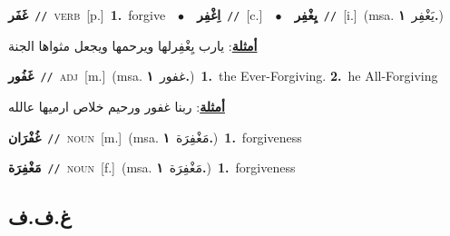 \documentclass[10pt,a4paper,twoside]{article} %
\begin{document}
\begin{multicols}{2}
{\setlength\topsep{0pt}\textbf{\foreignlanguage{arabic}{غَفَر}}\ {\color{gray}\texttt{//}\color{black}}\ \textsc{verb}\ [p.]\ \textbf{1.}~forgive\ \ $\bullet$\ \ \setlength\topsep{0pt}\textbf{\foreignlanguage{arabic}{اِغْفِر}}\ {\color{gray}\texttt{//}\color{black}}\ [c.]\ \ $\bullet$\ \ \setlength\topsep{0pt}\textbf{\foreignlanguage{arabic}{يِغْفِر}}\ {\color{gray}\texttt{//}\color{black}}\ [i.]\ \color{gray}(msa. \foreignlanguage{arabic}{يَغْفِر}~\foreignlanguage{arabic}{\textbf{١.}})\color{black}\  \begin{flushright}\color{gray}\foreignlanguage{arabic}{\textbf{\underline{\foreignlanguage{arabic}{أمثلة}}}: يارب يِغْفِرلها ويرحمها ويجعل مثواها الجنة}\end{flushright}\color{black}} \vspace{2mm}

{\setlength\topsep{0pt}\textbf{\foreignlanguage{arabic}{غَفُور}}\ {\color{gray}\texttt{//}\color{black}}\ \textsc{adj}\ [m.]\ \color{gray}(msa. \foreignlanguage{arabic}{غفور}~\foreignlanguage{arabic}{\textbf{١.}})\color{black}\ \textbf{1.}~the Ever-Forgiving.  \textbf{2.}~he All-Forgiving\  \begin{flushright}\color{gray}\foreignlanguage{arabic}{\textbf{\underline{\foreignlanguage{arabic}{أمثلة}}}: ربنا غفور ورحيم خلاص ارميها عالله}\end{flushright}\color{black}} \vspace{2mm}

{\setlength\topsep{0pt}\textbf{\foreignlanguage{arabic}{غُفْرَان}}\ {\color{gray}\texttt{//}\color{black}}\ \textsc{noun}\ [m.]\ \color{gray}(msa. \foreignlanguage{arabic}{مَغْفِرَة}~\foreignlanguage{arabic}{\textbf{١.}})\color{black}\ \textbf{1.}~forgiveness\ } \vspace{2mm}

{\setlength\topsep{0pt}\textbf{\foreignlanguage{arabic}{مَغْفِرَة}}\ {\color{gray}\texttt{//}\color{black}}\ \textsc{noun}\ [f.]\ \color{gray}(msa. \foreignlanguage{arabic}{مَغْفِرَة}~\foreignlanguage{arabic}{\textbf{١.}})\color{black}\ \textbf{1.}~forgiveness\ } \vspace{2mm}

\vspace{-3mm}
\subsection*{\color{blue}\foreignlanguage{arabic}{غ.ف.ف}\color{blue}{}} 


\end{multicols}
\end{document}
